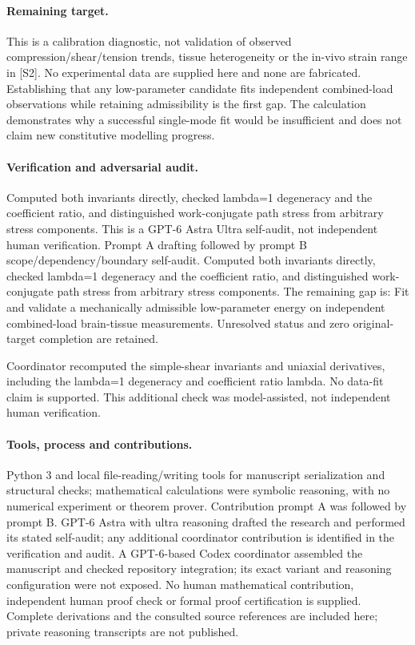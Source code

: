 \documentclass[11pt]{article}
\begin{document}
\paragraph{Remaining target.} This is a calibration diagnostic, not validation of observed compression/shear/tension trends, tissue heterogeneity or the in-vivo strain range in [S2]. No experimental data are supplied here and none are fabricated. Establishing that any low-parameter candidate fits independent combined-load observations while retaining admissibility is the first gap. The calculation demonstrates why a successful single-mode fit would be insufficient and does not claim new constitutive modelling progress.

\paragraph{Verification and adversarial audit.}
Computed both invariants directly, checked lambda=1 degeneracy and the coefficient ratio, and distinguished work-conjugate path stress from arbitrary stress components. This is a GPT-6 Astra Ultra self-audit, not independent human verification. Prompt A drafting followed by prompt B scope/dependency/boundary self-audit. Computed both invariants directly, checked lambda=1 degeneracy and the coefficient ratio, and distinguished work-conjugate path stress from arbitrary stress components. The remaining gap is: Fit and validate a mechanically admissible low-parameter energy on independent combined-load brain-tissue measurements. Unresolved status and zero original-target completion are retained.

Coordinator recomputed the simple-shear invariants and uniaxial derivatives, including the lambda=1 degeneracy and coefficient ratio lambda. No data-fit claim is supported. This additional check was model-assisted, not independent human verification.

\paragraph{Tools, process and contributions.}
Python 3 and local file-reading/writing tools for manuscript serialization and structural checks; mathematical calculations were symbolic reasoning, with no numerical experiment or theorem prover. Contribution prompt A was followed by prompt B. GPT-6 Astra with ultra reasoning drafted the research and performed its stated self-audit; any additional coordinator contribution is identified in the verification and audit. A GPT-6-based Codex coordinator assembled the manuscript and checked repository integration; its exact variant and reasoning configuration were not exposed. No human mathematical contribution, independent human proof check or formal proof certification is supplied. Complete derivations and the consulted source references are included here; private reasoning transcripts are not published.
\end{document}
